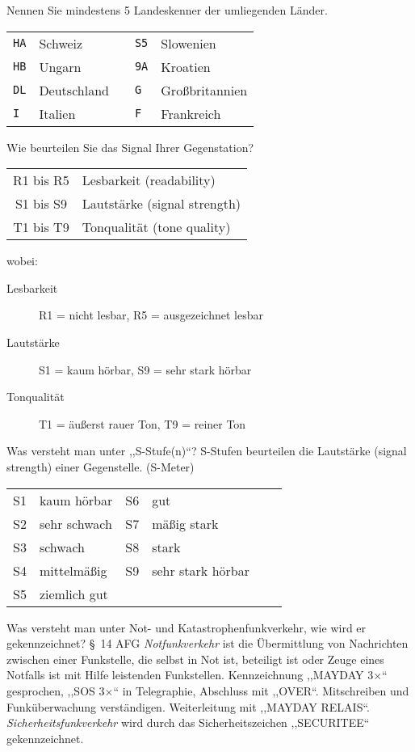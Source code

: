 \documentclass[avery5371,grid,frame,a4paper]{flashcards}
\newcommand{\card}[3]{
  \begin{flashcard}[{\chap} -- #1]{#2}#3\end{flashcard}
}
\begin{document}
\card{05}{Nennen Sie mindestens 5 Landeskenner der umliegenden Länder.}{
  \begin{tabular}{llcll}
    \texttt{HA} & Schweiz     & & \texttt{S5} & Slowenien \\
    \texttt{HB} & Ungarn      & & \texttt{9A} & Kroatien \\
    \texttt{DL} & Deutschland & & \texttt{G}  & Großbritannien \\
    \texttt{I}  & Italien     & & \texttt{F}  & Frankreich
  \end{tabular}
}
\card{06}{Wie beurteilen Sie das Signal Ihrer Gegenstation?}{
  \small
  \begin{tabular}{cl}
    R1 bis R5 & Lesbarkeit (readability) \\
    S1 bis S9 & Lautstärke (signal strength) \\
    T1 bis T9 & Tonqualität (tone quality)
  \end{tabular}
  \vspace{10pt}

  wobei:
  \begin{description}
    \item[Lesbarkeit] R1 = nicht lesbar, R5 = ausgezeichnet lesbar
    \item[Lautstärke] S1 = kaum hörbar, S9 = sehr stark hörbar
    \item[Tonqualität] T1 = äußerst rauer Ton, T9 = reiner Ton
  \end{description}
}
\card{07}{Was versteht man unter ,,S-Stufe(n)``?}{
  S-Stufen beurteilen die Lautstärke (signal strength) einer Gegenstelle. (S-Meter)

  \vspace{20pt}
  \begin{tabular}{clclcl}
    S1 & kaum hörbar    & S6 & gut  \\
    S2 & sehr schwach   & S7 & mäßig stark \\
    S3 & schwach        & S8 & stark \\
    S4 & mittelmäßig    & S9 & sehr stark hörbar \\
    S5 & ziemlich gut   &    & \\
  \end{tabular}
}
\card{08}{Was versteht man unter Not- und Katastrophenfunkverkehr, wie wird er gekennzeichnet?}{
  §~14 AFG \emph{Notfunkverkehr} ist die Übermittlung von Nachrichten zwischen einer Funkstelle, die selbst in Not ist, beteiligt ist oder Zeuge eines Notfalls ist mit Hilfe leistenden Funkstellen. Kennzeichnung ,,MAYDAY 3$\times$`` gesprochen, ,,SOS 3$\times$`` in Telegraphie, Abschluss mit ,,OVER``. Mitschreiben und Funküberwachung verständigen. Weiterleitung mit ,,MAYDAY RELAIS``. \emph{Sicherheitsfunkverkehr} wird durch das Sicherheitszeichen ,,SECURITEE`` gekennzeichnet.
}
\end{document}
